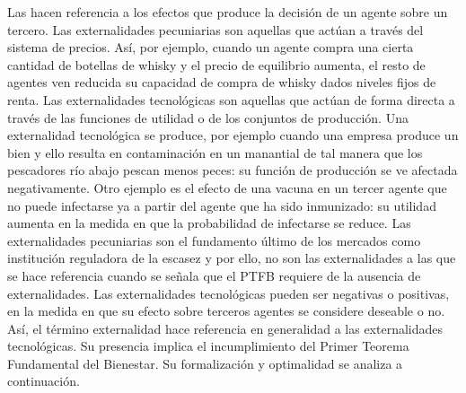 \documentclass{nuevotema}
\begin{document}
Las  hacen referencia a los efectos que produce la decisión de un agente sobre un tercero. Las externalidades pecuniarias son aquellas que actúan a través del sistema de precios. Así, por ejemplo, cuando un agente compra una cierta cantidad de botellas de whisky y el precio de equilibrio aumenta, el resto de agentes ven reducida su capacidad de compra de whisky dados niveles fijos de renta. Las externalidades tecnológicas son aquellas que actúan de forma directa a través de las funciones de utilidad o de los conjuntos de producción. Una externalidad tecnológica se produce, por ejemplo cuando una empresa produce un bien y ello resulta en contaminación en un manantial de tal manera que los pescadores río abajo pescan menos peces: su función de producción se ve afectada negativamente. Otro ejemplo es el efecto de una vacuna en un tercer agente que no puede infectarse ya a partir del agente que ha sido inmunizado: su utilidad aumenta en la medida en que la probabilidad de infectarse se reduce. Las externalidades pecuniarias son el fundamento último de los mercados como institución reguladora de la escasez y por ello, no son las externalidades a las que se hace referencia cuando se señala que el PTFB requiere de la ausencia de externalidades. Las externalidades tecnológicas pueden ser negativas o positivas, en la medida en que su efecto sobre terceros agentes se considere deseable o no. Así, el término externalidad hace referencia en generalidad a las externalidades tecnológicas. Su presencia implica el incumplimiento del Primer Teorema Fundamental del Bienestar. Su formalización y optimalidad se analiza a continuación.
\end{document}
